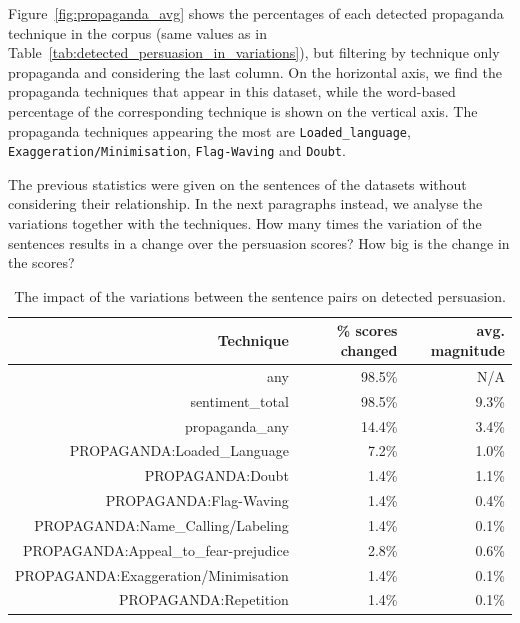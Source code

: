 Figure~\ref{fig:propaganda_avg} shows the percentages of each detected propaganda technique in the corpus (same values as in Table~\ref{tab:detected_persuasion_in_variations}), but filtering by technique only propaganda and considering the last column.
On the horizontal axis, we find the propaganda techniques that appear in this dataset, while the word-based percentage of the corresponding technique is shown on the vertical axis.
The propaganda techniques appearing the most are \texttt{Loaded\_language}, \texttt{Exaggeration/Minimisation}, \texttt{Flag-Waving} and \texttt{Doubt}.

The previous statistics were given on the sentences of the datasets without considering their relationship.
In the next paragraphs instead, we analyse the variations together with the techniques.
How many times the variation of the sentences results in a change over the persuasion scores? How big is the change in the scores?

\begin{table}[!htbp]
    \centering
    \begin{tabular}{r|rr}
         Technique & \% scores changed & avg. magnitude \\
         \hline
         any & 98.5\% & N/A \\
        sentiment\_total & 98.5\% & 9.3\% \\
        propaganda\_any & 14.4\% & 3.4\% \\
        PROPAGANDA:Loaded\_Language & 7.2\% & 1.0\% \\
        PROPAGANDA:Doubt & 1.4\% & 1.1\% \\
        PROPAGANDA:Flag-Waving & 1.4\% & 0.4\% \\
        PROPAGANDA:Name\_Calling/Labeling & 1.4\% & 0.1\% \\
        PROPAGANDA:Appeal\_to\_fear-prejudice & 2.8\% & 0.6\% \\
        PROPAGANDA:Exaggeration/Minimisation & 1.4\% & 0.1\% \\
        PROPAGANDA:Repetition & 1.4\% & 0.1\% \\
    \end{tabular}
    \caption{The impact of the variations between the sentence pairs on detected persuasion.}
    \label{tab:change_scores_persuasion_in_variations}
\end{table}

